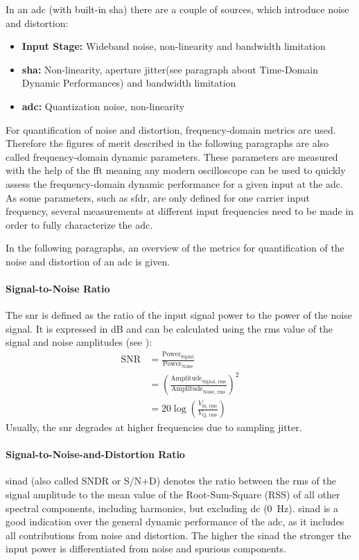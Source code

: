 In an \gls{adc} (with built-in \gls{sha}) there are a couple of sources, which introduce noise and distortion:
\begin{itemize}
	\item \textbf{Input Stage:} Wideband noise, non-linearity and bandwidth limitation
	\item \textbf{\gls{sha}:} Non-linearity, aperture jitter(see paragraph about Time-Domain Dynamic Performances) and bandwidth limitation %
	\item \textbf{\gls{adc}:} Quantization noise, non-linearity
\end{itemize}

For quantification of noise and distortion, frequency-domain metrics are used. 
Therefore the figures of merit described in the following paragraphs are also called frequency-domain dynamic parameters. 
These parameters are measured with the help of the \gls{fft} meaning any modern oscilloscope can be used to quickly assess the frequency-domain dynamic performance for a given input at the \gls{adc}.
As some parameters, such as \gls{sfdr}, are only defined for one carrier input frequency, several measurements at different input frequencies need to be made in order to fully characterize the \gls{adc}.

In the following paragraphs, an overview of the metrics for quantification of the noise and distortion of an \gls{adc} is given. 


\paragraph{Signal-to-Noise Ratio}
The \gls{snr} is defined as the ratio of the input signal power to the power of the noise signal. 
It is expressed in dB and can be calculated using the \gls{rms} value of the signal and noise amplitudes (see \cite{xilinx_adc}):
\begin{align}
	\text{SNR} &= \frac{\text{Power}_\text{Signal}}{\text{Power}_\text{Noise}}\\
	&= \left( \frac{\text{Amplitude}_\text{Signal, rms}}{\text{Amplitude}_\text{Noise, rms}} \right)^2\\
	&= 20 \log \left( \frac{V_\text{in, rms}}{V_\text{Q, rms}}\right) 
\end{align}
Usually, the \gls{snr} degrades at higher frequencies due to sampling jitter. \cite{xilinx_adc}

\paragraph{Signal-to-Noise-and-Distortion Ratio}
\gls{sinad} (also called SNDR or S/N+D) denotes the ratio between the \gls{rms} of the signal amplitude to the mean value of the Root-Sum-Square (RSS) of all other spectral components, including harmonics, but excluding \gls{dc} (\SI{0}{\hertz}). 
\gls{sinad} is a good indication over the general dynamic performance of the \gls{adc}, as it includes all contributions from noise and distortion.
The higher the \gls{sinad} the stronger the input power is differentiated from noise and spurious components. 

